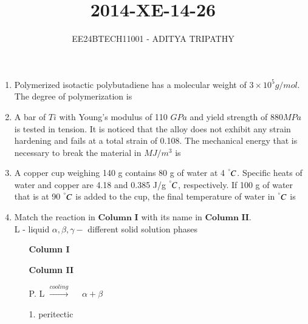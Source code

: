 \documentclass[journal,12pt,onecolumn]{IEEEtran}
\theoremstyle{remark}
\begin{document}

\vspace{3cm}

\title{2014-XE-14-26}
\author{EE24BTECH11001 -  ADITYA TRIPATHY}
\maketitle

\renewcommand{\thefigure}{\theenumi}
\renewcommand{\thetable}{\theenumi}

\begin{enumerate}
    \item 
        Polymerized isotactic polybutadiene has a molecular weight of $3 \times 10^5 g/mol$. The degree of
        polymerization is
        \hfill{}
        \\
    \item  A bar of $Ti$ with Young's modulus of 110 $GPa$ and yield strength of $880 MPa$ is tested in tension. It
        is noticed that the alloy does not exhibit any strain hardening and fails at a total strain of 0.108. The
        mechanical energy that is necessary to break the material in $MJ/m^3$ is		
        \hfill{}
        \\
    \item A copper cup weighing 140 g contains 80 g of water at 4 $^{\degree}C$. Specific heats of water and copper are
        4.18 and 0.385 J/g $^{\degree}C$, respectively. If 100 g of water that is at 90 $^{\degree}C$ is added to the cup, the final
        temperature of water in $^{\degree}C$ is
        \hfill{}
        \\

    \item Match the reaction in $\textbf{Column I}$ with its name in $\textbf{Column II}$.\\
        L - liquid $\alpha, \beta, \gamma -$ different solid solution phases

        \begin{multicols}{2}
            \begin{enumerate}
                \item[] \textbf{Column I} \columnbreak
                \item[] \textbf{Column II}
            \end{enumerate}
        \end{multicols}
        \begin{multicols}{2}
            \begin{enumerate}
                \item[P.] L $\xrightarrow{cooling}$ $\quad \alpha + \beta$ \columnbreak
                \item[1.] peritectic
            \end{enumerate}


\end{multicols}
\end{enumerate}
\end{document}
